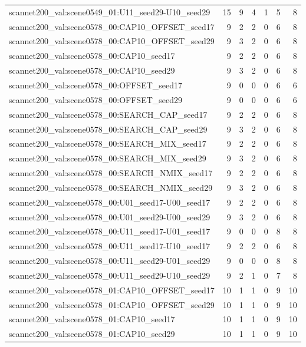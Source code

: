 \begin{table}[t]
\begin{tabular}{lrrrrrr}
scannet200\_val:scene0549\_01:U11\_seed29-U10\_seed29 & 15 & 9 & 4 & 1 & 5 & 8 \\
scannet200\_val:scene0578\_00:CAP10\_OFFSET\_seed17 & 9 & 2 & 2 & 0 & 6 & 8 \\
scannet200\_val:scene0578\_00:CAP10\_OFFSET\_seed29 & 9 & 3 & 2 & 0 & 6 & 8 \\
scannet200\_val:scene0578\_00:CAP10\_seed17 & 9 & 2 & 2 & 0 & 6 & 8 \\
scannet200\_val:scene0578\_00:CAP10\_seed29 & 9 & 3 & 2 & 0 & 6 & 8 \\
scannet200\_val:scene0578\_00:OFFSET\_seed17 & 9 & 0 & 0 & 0 & 6 & 6 \\
scannet200\_val:scene0578\_00:OFFSET\_seed29 & 9 & 0 & 0 & 0 & 6 & 6 \\
scannet200\_val:scene0578\_00:SEARCH\_CAP\_seed17 & 9 & 2 & 2 & 0 & 6 & 8 \\
scannet200\_val:scene0578\_00:SEARCH\_CAP\_seed29 & 9 & 3 & 2 & 0 & 6 & 8 \\
scannet200\_val:scene0578\_00:SEARCH\_MIX\_seed17 & 9 & 2 & 2 & 0 & 6 & 8 \\
scannet200\_val:scene0578\_00:SEARCH\_MIX\_seed29 & 9 & 3 & 2 & 0 & 6 & 8 \\
scannet200\_val:scene0578\_00:SEARCH\_NMIX\_seed17 & 9 & 2 & 2 & 0 & 6 & 8 \\
scannet200\_val:scene0578\_00:SEARCH\_NMIX\_seed29 & 9 & 3 & 2 & 0 & 6 & 8 \\
scannet200\_val:scene0578\_00:U01\_seed17-U00\_seed17 & 9 & 2 & 2 & 0 & 6 & 8 \\
scannet200\_val:scene0578\_00:U01\_seed29-U00\_seed29 & 9 & 3 & 2 & 0 & 6 & 8 \\
scannet200\_val:scene0578\_00:U11\_seed17-U01\_seed17 & 9 & 0 & 0 & 0 & 8 & 8 \\
scannet200\_val:scene0578\_00:U11\_seed17-U10\_seed17 & 9 & 2 & 2 & 0 & 6 & 8 \\
scannet200\_val:scene0578\_00:U11\_seed29-U01\_seed29 & 9 & 0 & 0 & 0 & 8 & 8 \\
scannet200\_val:scene0578\_00:U11\_seed29-U10\_seed29 & 9 & 2 & 1 & 0 & 7 & 8 \\
scannet200\_val:scene0578\_01:CAP10\_OFFSET\_seed17 & 10 & 1 & 1 & 0 & 9 & 10 \\
scannet200\_val:scene0578\_01:CAP10\_OFFSET\_seed29 & 10 & 1 & 1 & 0 & 9 & 10 \\
scannet200\_val:scene0578\_01:CAP10\_seed17 & 10 & 1 & 1 & 0 & 9 & 10 \\
scannet200\_val:scene0578\_01:CAP10\_seed29 & 10 & 1 & 1 & 0 & 9 & 10 \\

\end{tabular}
\end{table}
